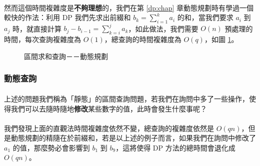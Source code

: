 \documentclass[12pt,a4paper,oneside]{report}
\begin{document}
\begin{CJK}{UTF8}{bkai}
\paragraph{}然而這個時間複雜度是\textbf{不夠理想}的，我們在第 \ref{dp:chap} 章動態規劃時有學過一個較快的作法：利用 DP 我們先求出前綴和 $b_k=\displaystyle\sum_{i=1}^{k}{a_i}$ 的和，當我們要求 $a_i$ 到 $a_j$ 時，就直接計算 $b_j-b_{i-1}=\displaystyle\sum_{k=i}^{j}{a_k}$，如此做法，我們需要 $O(n)$ 預處理的時間，每次查詢複雜度為 $O(1)$，總查詢的時間複雜度為 $O(q)$，如圖 \ref{tree:fig:rsq:dp}。

\begin{figure}[h]
\centering
{}
\caption{區間求和查詢－－動態規劃}
\label{tree:fig:rsq:dp}
\end{figure}

\subsubsection{動態查詢}

\paragraph{}上述的問題我們稱為「靜態」的區間查詢問題，若我們在詢問中多了一些操作，使得我們可以去隨時隨地\textbf{修改}某些數字的值，此時會發生什麼事呢？

\paragraph{}我們發現上面的直觀法時間複雜度依然不變，總查詢的複雜度依然是 $O(qn)$，但是動態規劃的精隨在於前綴和，若是以上述的例子而言，如果我們在詢問中修改了 $a_1$ 的值，那麼勢必會影響到 $b_1$ 到 $b_9$，這將使得 DP 方法的總時間會退化成 $O(qn)$。


\end{CJK}
\end{document}
